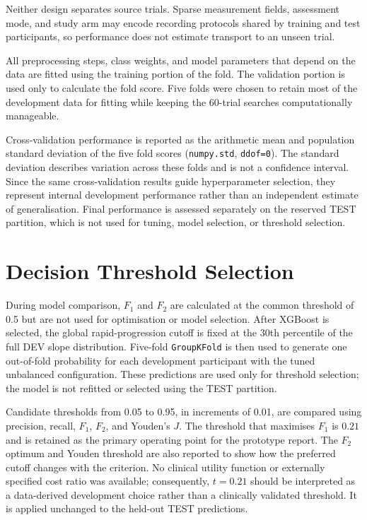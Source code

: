 Neither design separates source trials. Sparse measurement fields, assessment mode, and study arm may encode recording protocols shared by training and test participants, so performance does not estimate transport to an unseen trial.

All preprocessing steps, class weights, and model parameters that depend on the data are fitted using the training portion of the fold. The validation portion is used only to calculate the fold score. Five folds were chosen to retain most of the development data for fitting while keeping the 60-trial searches computationally manageable.

Cross-validation performance is reported as the arithmetic mean and population standard deviation of the five fold scores (\texttt{numpy.std}, \texttt{ddof=0}). The standard deviation describes variation across these folds and is not a confidence interval. Since the same cross-validation results guide hyperparameter selection, they represent internal development performance rather than an independent estimate of generalisation. Final performance is assessed separately on the reserved \gls{TEST} partition, which is not used for tuning, model selection, or threshold selection.

\section{Decision Threshold Selection}
\label{sec:methods_threshold}
During model comparison, $F_1$ and $F_2$ are calculated at the common threshold of 0.5 but are not used for optimisation or model selection. After XGBoost is selected, the global rapid-progression cutoff is fixed at the 30th percentile of the full \gls{DEV} slope distribution. Five-fold \texttt{GroupKFold} is then used to generate one out-of-fold probability for each development participant with the tuned unbalanced configuration. These predictions are used only for threshold selection; the model is not refitted or selected using the \gls{TEST} partition.

Candidate thresholds from 0.05 to 0.95, in increments of 0.01, are compared using precision, recall, $F_1$, $F_2$, and Youden's $J$. The threshold that maximises $F_1$ is $0.21$ and is retained as the primary operating point for the prototype report. The $F_2$ optimum and Youden threshold are also reported to show how the preferred cutoff changes with the criterion. No clinical utility function or externally specified cost ratio was available; consequently, $t=0.21$ should be interpreted as a data-derived development choice rather than a clinically validated threshold. It is applied unchanged to the held-out \gls{TEST} predictions.

